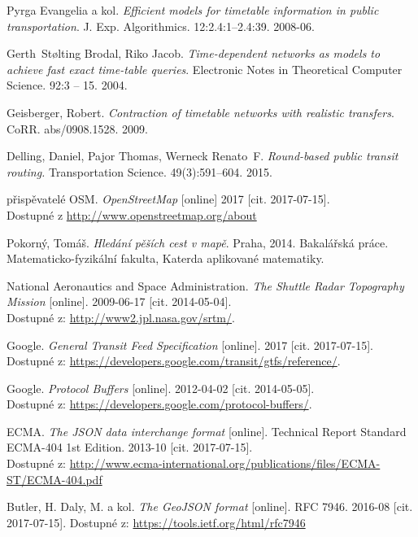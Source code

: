 \begin{thebibliography}{10}

	{\sc Pyrga} Evangelia a kol.
	\emph{Efficient models for timetable information in public
	transportation}.
	J. Exp. Algorithmics. 12:2.4:1--2.4:39. 2008-06.

	{\sc Gerth~Stølting} Brodal, {\sc Riko} Jacob.
	\emph{Time-dependent networks as models to achieve fast exact
	time-table queries}. 
	Electronic Notes in Theoretical Computer Science.
	92:3 -- 15. 2004.

	{\sc Geisberger}, Robert.
	\emph{Contraction of timetable networks with realistic transfers}.
	CoRR.
	abs/0908.1528. 2009.

	{\sc Delling}, Daniel, {\sc Pajor} Thomas, {\sc Werneck} Renato~F.
	\emph{Round-based public transit routing.}
	Transportation Science.
	49(3):591--604. 2015.

	{\sc přispěvatelé OSM}.
	\emph{OpenStreetMap} [online]
	2017 [cit. 2017-07-15].\\
	Dostupné z \url{http://www.openstreetmap.org/about}

	{\sc Pokorný}, Tomáš.
	\emph{Hledání pěších cest v mapě}.
	Praha, 
	2014.
	Bakalářská práce. Matematicko-fyzikální fakulta, Katerda aplikované
	matematiky.

	{\sc National Aeronautics and Space Administration.}
	\emph{The Shuttle Radar Topography Mission} [online]. 
	2009-06-17 [cit. 2014-05-04]. \\
	Dostupné z: \url{http://www2.jpl.nasa.gov/srtm/}.

	{\sc Google.}
	\emph{General Transit Feed Specification} [online]. 
	2017 [cit. 2017-07-15]. \\
	Dostupné z: \url{https://developers.google.com/transit/gtfs/reference/}.

	{\sc Google.}
	\emph{Protocol Buffers} [online]. 
	2012-04-02 [cit. 2014-05-05]. \\
	Dostupné z: \url{https://developers.google.com/protocol-buffers/}.

	{\sc ECMA}.
	\emph{The {JSON} data interchange format} [online].
	Technical Report Standard ECMA-404 1st Edition.
	2013-10 [cit. 2017-07-15].\\
	Dostupné z:
	\url{http://www.ecma-international.org/publications/files/ECMA-ST/ECMA-404.pdf}

	{\sc Butler}, H. {\sc Daly}, M. a kol.
	\emph{The GeoJSON format} [online].
	RFC 7946.
	2016-08 [cit. 2017-07-15].
	Dostupné z: \url{https://tools.ietf.org/html/rfc7946}


\end{thebibliography}
